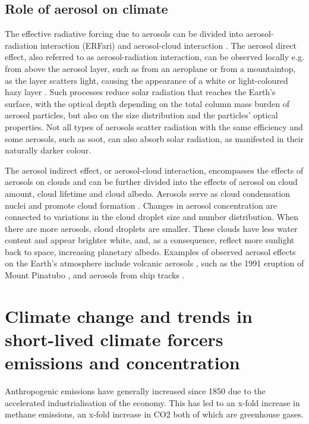 \subsection{Role of aerosol on climate}

The effective radiative forcing due to aerosols can be divided into aerosol-radiation interaction (ERFari) and aerosol-cloud interaction \citep[ERFaci;][]{ghanTechnicalNoteEstimating2013}. The aerosol direct effect, also referred to as aerosol-radiation interaction, can be observed locally e.g. from above the aerosol layer, such as from an aeroplane or from a mountaintop, as the layer scatters light, causing the appearance of a white or light-coloured hazy layer \citep{twomeyInfluencePollutionShortwave1977}. Such processes reduce solar radiation that reaches the Earth’s surface, with the optical depth depending on the total column mass burden of aerosol particles, but also on the size distribution and the particles’ optical properties. Not all types of aerosols scatter radiation with the same efficiency and some aerosols, such as soot, can also absorb solar radiation, as manifested in their naturally darker colour. 

The aerosol indirect effect, or aerosol-cloud interaction, encompasses the effects of aerosols on clouds and can be further divided into the effects of aerosol on cloud amount, cloud lifetime and cloud albedo.  Aerosols serve as cloud condensation nuclei and promote cloud formation \citep{albrechtAerosolsCloudMicrophysics1989}.  Changes in aerosol concentration are connected to variations in the cloud droplet size and number distribution. When there are more aerosols, cloud droplets are smaller. These clouds have less water content and appear brighter white, and, as a consequence, reflect more sunlight back to space, increasing planetary albedo. Examples of observed aerosol effects on the Earth’s atmosphere include volcanic aerosols \citep[e.g.][]{malavelleStrongConstraintsAerosol2017}, such as the 1991 eruption of Mount Pinatubo \citep{hansenPotentialClimateImpact1992}, and aerosols from ship tracks \citep{twohyEvaluationAerosolIndirect2005}. 



\section{Climate change and trends in short-lived climate forcers emissions and concentration}

Anthropogenic emissions have generally increased since 1850 due to the accelerated industrialisation of the economy. This has led to an x-fold increase in methane emissions, an x-fold increase in CO2 both of which are greenhouse gases. 

